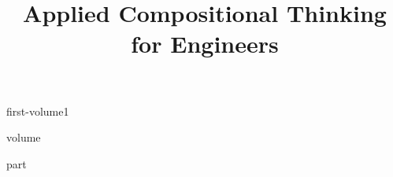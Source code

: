 

\title{Applied Compositional Thinking\\ for Engineers}
\date{}

\frontmatter
{first-volume1}


\tableofcontents

\mainmatter
{}
{volume}
%
%
%
%
%
%
%
%
%
%
%
%
\backmatter

{part}


\codeexercises{
  
}


